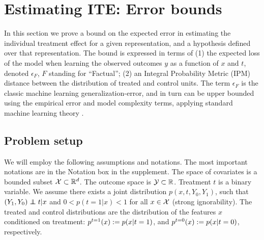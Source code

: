 \section{Estimating ITE: Error bounds}\label{sec:theory}

In this section we prove a bound on the expected error in estimating the individual treatment effect for a given representation, and a hypothesis defined over that representation.
The bound is expressed in terms of (1) the expected loss of the model when learning the observed outcomes $y$ as a function of $x$ and $t$, denoted $\epsilon_F$, $F$ standing for ``Factual''; (2) an Integral Probability Metric (IPM) distance between the distribution of treated and control units. The term $\epsilon_F$ is the classic machine learning generalization-error, and in turn can be upper bounded using the empirical error and model complexity terms, applying standard machine learning theory \citep{shalev2014understanding}.

\subsection{Problem setup}
We will employ the following assumptions and notations. The most important notations are in the Notation box in the supplement.
The space of covariates is a bounded subset $\mathcal X \subset \mathbb{R}^d$. The outcome space is $\mathcal Y\subset \mathbb{R}$. Treatment $t$ is a binary variable. We assume there exists a joint distribution $p(x,t,Y_0,Y_1)$, such that $(Y_1,Y_0) \indep t |x$ and $0<p(t=1|x)<1$ for all $x\in \mathcal X$ (strong ignorability).
The treated and control distributions are the distribution of the features $x$ conditioned on treatment: $p^{t=1}(x) := p(x|t=1)$, and $p^{t=0}(x) := p(x|t=0)$, respectively.





